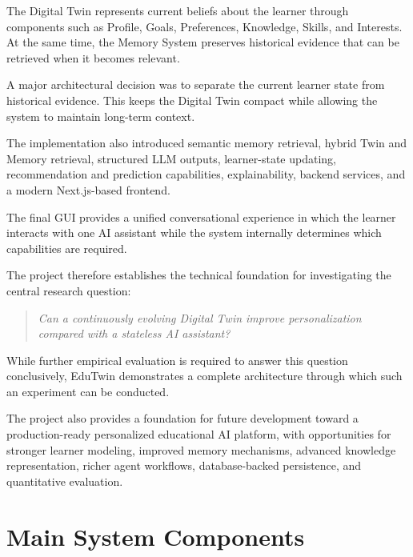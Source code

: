 \documentclass[12pt,a4paper]{article}
\begin{document}
The Digital Twin represents current beliefs about the learner through components such as Profile, Goals, Preferences, Knowledge, Skills, and Interests. At the same time, the Memory System preserves historical evidence that can be retrieved when it becomes relevant.

A major architectural decision was to separate the current learner state from historical evidence. This keeps the Digital Twin compact while allowing the system to maintain long-term context.

The implementation also introduced semantic memory retrieval, hybrid Twin and Memory retrieval, structured LLM outputs, learner-state updating, recommendation and prediction capabilities, explainability, backend services, and a modern Next.js-based frontend.

The final GUI provides a unified conversational experience in which the learner interacts with one AI assistant while the system internally determines which capabilities are required.

The project therefore establishes the technical foundation for investigating the central research question:
\begin{quote}
\textit{Can a continuously evolving Digital Twin improve personalization compared with a stateless AI assistant?}
\end{quote}

While further empirical evaluation is required to answer this question conclusively, EduTwin demonstrates a complete architecture through which such an experiment can be conducted.

The project also provides a foundation for future development toward a production-ready personalized educational AI platform, with opportunities for stronger learner modeling, improved memory mechanisms, advanced knowledge representation, richer agent workflows, database-backed persistence, and quantitative evaluation.

\newpage
\appendix

\section{Main System Components}
\end{document}
